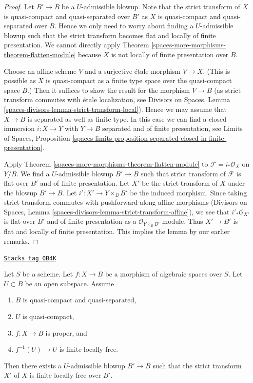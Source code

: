 \begin{proof}
Let $B' \to B$ be a $U$-admissible blowup. Note that the strict transform
of $X$ is quasi-compact and quasi-separated over $B'$ as $X$ is quasi-compact
and quasi-separated over $B$. Hence we only need to worry about finding
a $U$-admissible blowup such that the strict transform becomes flat and
locally of finite presentation. We cannot directly apply
Theorem \ref{spaces-more-morphisms-theorem-flatten-module} because $X$ is not locally of finite
presentation over $B$.

\medskip\noindent
Choose an affine scheme $V$ and a surjective \'etale morphism $V \to X$.
(This is possible as $X$ is quasi-compact as a finite type space over
the quasi-compact space $B$.) Then it suffices to show the result for
the morphism $V \to B$ (as strict transform commutes with \'etale
localization, see Divisors on Spaces,
Lemma \ref{spaces-divisors-lemma-strict-transform-local}).
Hence we may assume that $X \to B$ is separated as well as finite type.
In this case we can find a closed immersion $i : X \to Y$ with $Y \to B$
separated and of finite presentation, see
Limits of Spaces, Proposition
\ref{spaces-limits-proposition-separated-closed-in-finite-presentation}.

\medskip\noindent
Apply Theorem \ref{spaces-more-morphisms-theorem-flatten-module} to $\mathcal{F} = i_*\mathcal{O}_X$
on $Y/B$. We find a $U$-admissible blowup $B' \to B$ such that strict
transform of $\mathcal{F}$ is flat over $B'$ and of finite presentation.
Let $X'$ be the strict transform of $X$ under the blowup $B' \to B$.
Let $i' : X' \to Y \times_B B'$ be the induced morphism.
Since taking strict transform commutes with pushforward along affine
morphisms (Divisors on Spaces, Lemma
\ref{spaces-divisors-lemma-strict-transform-affine}),
we see that $i'_*\mathcal{O}_{X'}$ is flat over $B'$ and of
finite presentation as a $\mathcal{O}_{Y \times_B B'}$-module.
Thus $X' \to B'$ is flat and locally of finite presentation.
This implies the lemma by our earlier remarks.
\end{proof}

\begin{lemma}
\label{spaces-more-morphisms-lemma-finite-after-blowing-up}
\href{https://stacks.math.columbia.edu/tag/0B4K}{\texttt{Stacks tag 0B4K}}

Let $S$ be a scheme. Let $f : X \to B$ be a morphism of algebraic
spaces over $S$. Let $U \subset B$ be an open subspace. Assume
\begin{enumerate}
\item $B$ is quasi-compact and quasi-separated,
\item $U$ is quasi-compact,
\item $f : X \to B$ is proper, and
\item $f^{-1}(U) \to U$ is finite locally free.
\end{enumerate}
Then there exists a $U$-admissible blowup $B' \to B$ such that
the strict transform $X'$ of $X$ is finite locally free over $B'$.
\end{lemma}

